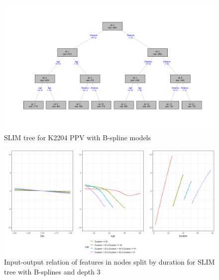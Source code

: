 \begin{figure}[!htb]
    \centering   
    \includegraphics[width = 16cm]{Figures/insurance_use_case/k2204_PPV/slim_bsplines_small_tree.png}
         \caption{SLIM tree for K2204 PPV with B-spline models}
     \label{fig:ins_k2204_ppv_slim_bsplines_tree}
\end{figure}



\begin{figure}[!htb]
    \centering
    \includegraphics[width = 16cm]{Figures/insurance_use_case/k2204_PPV/effects_duration.png}
    \caption{Input-output relation of features in nodes split by duration for SLIM tree with B-splines and depth 3}
    \label{fig:ins_k2204_ppv_effects_duration}
\end{figure}




